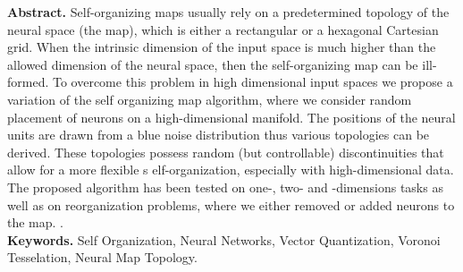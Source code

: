 
\maketitle

\noindent\textbf{Abstract.} Self-organizing maps usually rely on a
predetermined topology of the neural space (the map), which is either
a rectangular or a hexagonal Cartesian grid. When the intrinsic dimension of 
the input space is much higher than the allowed dimension of the neural space,
then the self-organizing map can be ill-formed. To overcome this problem in 
high dimensional input spaces we propose a variation of the self organizing map
algorithm, where we consider random placement of neurons on a high-dimensional
manifold. The positions of the neural units are drawn from a blue noise 
distribution thus various topologies can be derived. These topologies possess 
random (but controllable) discontinuities that allow for a more flexible s
elf-organization, especially with high-dimensional data. The proposed algorithm
has been tested on one-, two- and \gid[X]-dimensions tasks as well as on 
reorganization problems, where we either removed or added neurons to the map.
.\\


\noindent\textbf{Keywords.} Self Organization, Neural Networks, 
Vector Quantization, Voronoi Tesselation, Neural Map Topology.

\bigskip
